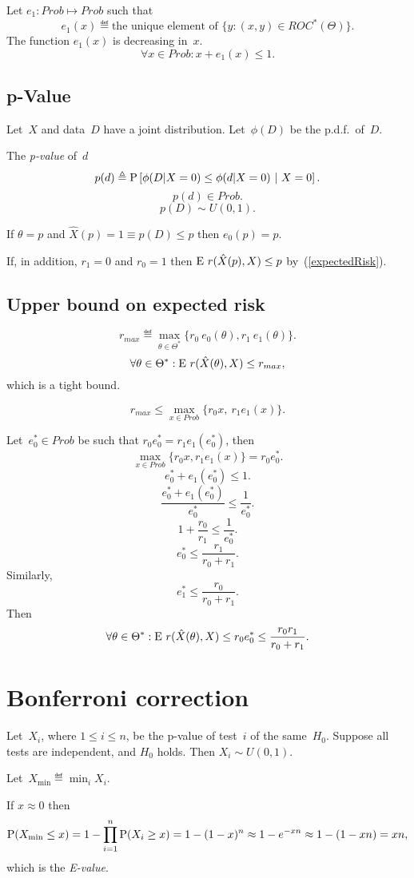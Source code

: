 \documentclass[10pt,a4paper]{article}
\theoremstyle{plain} \newtheorem{Lem}{Lemma}
\begin{document}
Let $e_1: Prob \mapsto Prob$ such that
$$ e_1(x) \eqdef \text{the unique element of } \{ y : (x,y) \in ROC^*(\Theta) \}. $$
The function $e_1(x)$ is decreasing in~$x$.
$$ \forall x \in Prob : x + e_1(x) \le 1. $$


\subsection {p-Value}
Let~$X$ and data~$D$ have a joint distribution.
Let~$\phi(D)$ be the p.d.f.~of~$D$.

The {\em p-value} of~$d$
$$ p(d) \eqdef \P\left[\phi(D|X=0) \le \phi(d|X=0) \ | \ X=0 \right]. $$
$$ p(d) \in Prob. $$
$$ p(D) \sim U(0,1). $$

If $\theta = p$ and $\hat X(p) = 1 \equiv p(D) \le p$ then $e_0(p) = p$.

If, in addition, $r_1=0$ and $r_0=1$ then $\E r(\hat X(p), X) \le p$ by~(\ref{expectedRisk}).


\subsection {Upper bound on expected risk}
$$ r_{max} \eqdef \max_{\theta \in \Theta^*} \{r_0 \ e_0(\theta), r_1 \ e_1(\theta) \}. $$
$$ \forall \theta \in \Theta^* : \E r(\hat X(\theta), X) \le r_{max}, $$
which is a tight bound.

$$r_{max} \le \max_{x \in Prob} \{ r_0 x, \ r_1 e_1(x) \}. $$

Let~$e_0^* \in Prob$ be such that $r_0 e_0^* = r_1 e_1(e_0^*)$, then
$$ \max_{x \in Prob} \{ r_0 x, r_1 e_1(x) \} = r_0 e_0^*. $$
$$ e_0^* + e_1(e_0^*) \le 1. $$
$$ \frac {e_0^* + e_1(e_0^*)} {e_0^*} \le \frac 1 {e_0^*}. $$
$$ 1 + \frac {r_0} {r_1} \le  \frac 1 {e_0^*}. $$
$$ e_0^* \le \frac {r_1} {r_0 + r_1}. $$
Similarly,
$$ e_1^* \le \frac {r_0} {r_0 + r_1}. $$
Then
$$ \forall \theta \in \Theta^* : \E r(\hat X(\theta), X) \le r_0 e_0^* \le \frac {r_0 r_1} {r_0 + r_1}. $$


\section{Bonferroni correction}

Let~$X_i$, where $1 \le i \le n$, be the p-value of test~$i$ of the same~$H_0$.
Suppose all tests are independent, and $H_0$ holds.
Then $X_i \sim U(0,1)$.

Let~$X_{\min} \eqdef \min_i X_i$.

If $x \approx 0$ then
$$ \P(X_{\min} \le x) = 1 - \prod_{i=1}^n \P(X_i \ge x) = 1 - (1 - x)^n \approx 1 - e^{-xn} \approx 1 - (1 - xn) = xn, $$
which is the {\em E-value}.
\end{document}
